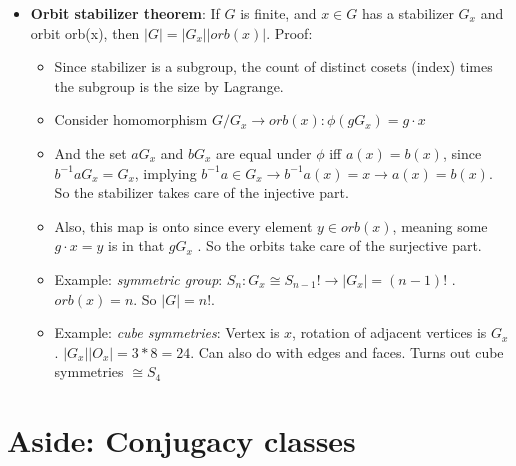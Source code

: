 \documentclass[11pt, oneside]{article}   	%
\begin{document}
\begin{itemize}
\item \textbf{Orbit stabilizer theorem}: If $G$ is finite, and $x \in G$ has a stabilizer $G_x$ and orbit orb(x), then $|G| = |G_x| |orb(x)|$.  Proof:
\begin{itemize}
\item Since stabilizer is a subgroup, the count of distinct cosets (index) times the subgroup is the size by Lagrange. 
\item Consider homomorphism  $G / G_x \rightarrow orb(x): \phi(gG_x) = g \cdot x$
\item And the set $aG_x$ and $bG_x$ are equal under $\phi$  iff $a(x) = b(x)$, since $b^{-1}aG_x= G_x$, implying $b^{-1}a \in G_x \rightarrow b^{-1}a(x) = x \rightarrow a(x) = b(x)$.  So the stabilizer takes care of the injective part.
\item Also, this map is onto since every element $y \in orb(x)$, meaning some $g \cdot x = y$ is in that $gG_x$ .  So the orbits take care of the surjective part.
\item Example: \emph{symmetric group}: $S_n: G_x \cong S_{n-1}! \rightarrow |G_x| = (n-1)!$ .  $orb(x) = n$.  So $|G| = n!$.
\item Example: \emph{cube symmetries}: Vertex is $x$, rotation of adjacent vertices is $G_x$. $|G_x| |O_x| = 3* 8 = 24$.  Can also do with edges and faces.  Turns out cube symmetries $\cong S_4$
\end{itemize}
\end{itemize}


\section{Aside: Conjugacy classes}
\end{document}
